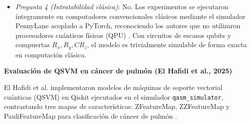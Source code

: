 \begin{itemize}
  \item \textit{Pregunta 4 (Intratabilidad clásica)}: No. 
Los experimentos se ejecutaron íntegramente en computadores convencionales clásicos mediante el simulador PennyLane acoplado a PyTorch, reconociendo los autores que no utilizaron procesadores cuánticos físicos (QPU) \cite{Xiang2024QuantumCNN}. Con circuitos de escasos qubits y compuertas $R_x, R_y, CR_z$, el modelo es trivialmente simulable de forma exacta en computación clásica.
\end{itemize}

\textbf{Evaluación de QSVM en cáncer de pulmón (El Hafidi et al., 2025)}

El Hafidi et al. implementaron modelos de máquinas de soporte vectorial cuánticas (QSVM) en Qiskit ejecutados en el simulador \texttt{qasm\_simulator}, contrastando tres mapas de características: ZFeatureMap, ZZFeatureMap y PauliFeatureMap para clasificación de cáncer de pulmón \cite{ElHafidi2025}.

